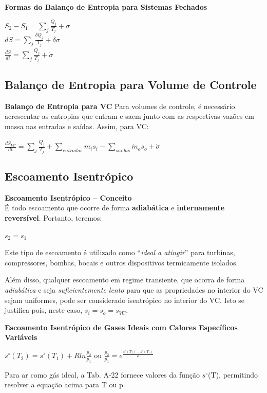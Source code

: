 \documentclass[a4paper, 12pt]{article}
\begin{document}
\textbf{Formas do Balanço de Entropia para Sistemas Fechados}
	\begin{center}
		\large
		$ S_2 - S_1 = \sum_{j}^{} \frac{Q_j}{T_j} + \sigma$\\
		
		$ dS = \sum_{j}^{} \frac{\delta Q_j}{T_j} + \delta \sigma $\\
		
		$ \frac{dS}{dt} = \sum_{j}^{} \frac{\dot{Q_j}}{T_j} + \dot{\sigma} $
	\end{center}

\subsection{Balanço de Entropia para Volume de Controle}
\textbf{Balanço de Entropia para VC}
Para volumes de controle, é necessário acrescentar as entropias que entram e saem junto com as respectivas vazões em massa nas entradas e saídas. Assim, para VC:
	\begin{center}
		\large
		$ \frac{dS_{VC}}{dt} = \sum_{j} \frac{\dot{Q}_j}{T_j} + \sum_{entradas} \dot{m}_is_i - \sum_{saidas} \dot{m}_os_o + \dot{\sigma} $
	\end{center}

\subsection{Escoamento Isentrópico}
\textbf{Escoamento Isentrópico – Conceito}\\
É todo escoamento que ocorre de forma \textbf{adiabática} e \textbf{internamente reversível}. Portanto, teremos:
	\begin{center}
		\large
		$ s_2 = s_1 $
	\end{center}

Este tipo de escoamento é utilizado como “\textit{ideal a atingir}” para turbinas,
compressores, bombas, bocais e outros dispositivos termicamente isolados.

Além disso, qualquer escoamento em regime transiente, que ocorra de forma
\textit{adiabática} e seja \textit{suficientemente lento} para que as propriedades no interior
do VC sejam uniformes, pode ser considerado isentrópico no interior do VC.
Isto se justifica pois, neste caso, $ s_i = s_o = s_{VC} $.

\textbf{Escoamento Isentrópico de Gases Ideais com Calores Específicos Variáveis}\\
	\begin{center}
		\large
		$ s^{\circ}(T_2) = s^{\circ}(T_1) + Rln\frac{p_2}{p_1} $ ou $ \frac{p_2}{p_1} = e^{\frac{s^{\circ}(T_2) - s^{\circ}(T_1)}{R}} $
	\end{center}
Para ar como gás ideal, a Tab. A-22 fornece valores da função $ s^{\circ} $(T), permitindo resolver a equação acima para T ou p.\\
\end{document}
